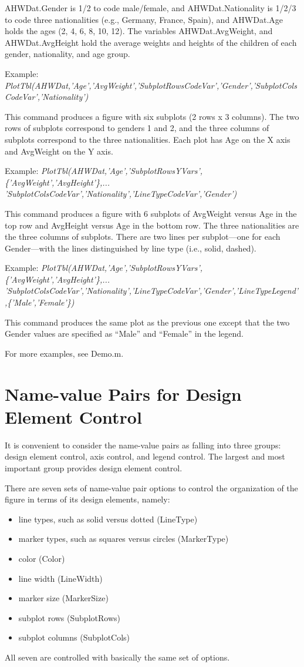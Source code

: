 \documentclass{article}
\newcommand{\example}[1]{Example: {\it #1}}
\begin{document}
AHWDat.Gender is 1/2 to code male/female, and AHWDat.Nationality is 1/2/3 to code three nationalities
(e.g., Germany, France, Spain), and AHWDat.Age holds the ages (2, 4, 6, 8, 10, 12).
The variables AHWDat.AvgWeight, and AHWDat.AvgHeight hold the average
weights and heights of the children of each gender, nationality, and age group.

\example{PlotTbl(AHWDat,'Age','AvgWeight','SubplotRowsCodeVar','Gender','SubplotColsCodeVar','Nationality')}

This command produces a figure with six subplots (2 rows x 3 columns).
The two rows of subplots correspond to genders 1 and 2,
and the three columns of subplots correspond to the three nationalities.
Each plot has Age on the X axis and AvgWeight on the Y axis.

\example{PlotTbl(AHWDat,'Age','SubplotRowsYVars',\{'AvgWeight','AvgHeight'\},... \\
'SubplotColsCodeVar','Nationality','LineTypeCodeVar','Gender')}

This command produces a figure with 6 subplots of AvgWeight versus Age in the top row and
AvgHeight versus Age in the bottom row.  The three nationalities are the three columns of subplots.
There are two lines per subplot---one for each Gender---with the lines distinguished by
line type (i.e., solid, dashed).

\example{PlotTbl(AHWDat,'Age','SubplotRowsYVars',\{'AvgWeight','AvgHeight'\},... \\
'SubplotColsCodeVar','Nationality','LineTypeCodeVar','Gender','LineTypeLegend',\{'Male','Female'\})}

This command produces the same plot as the previous one except that the two Gender values are specified
as ``Male'' and ``Female'' in the legend.

For more examples, see Demo.m.

\section{Name-value Pairs for Design Element Control}

It is convenient to consider the name-value pairs as falling into three groups: design element control,
axis control, and legend control.
The largest and most important group provides design element control.

There are seven sets of name-value pair options to control the organization of
the figure in terms of its design elements, namely:
\begin{itemize}
\item line types, such as solid versus dotted (LineType)
\item marker types, such as squares versus circles (MarkerType)
\item color (Color)
\item line width (LineWidth)
\item marker size (MarkerSize)
\item subplot rows (SubplotRows)
\item subplot columns (SubplotCols)
\end{itemize}
All seven are controlled with basically the same set of options.
\end{document}
